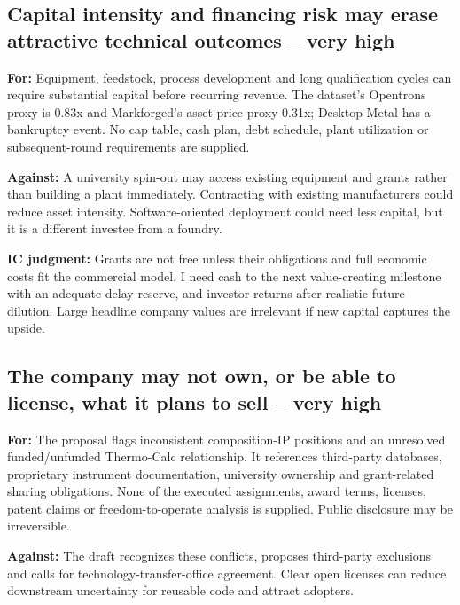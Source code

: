 \documentclass{article}
\begin{document}
\subsection{Capital intensity and financing risk may erase attractive
technical outcomes -- very
high}\label{capital-intensity-and-financing-risk-may-erase-attractive-technical-outcomes-very-high}

\textbf{For:} Equipment, feedstock, process development and long
qualification cycles can require substantial capital before recurring
revenue. The dataset's Opentrons proxy is 0.83x and Markforged's
asset-price proxy 0.31x; Desktop Metal has a bankruptcy event. No cap
table, cash plan, debt schedule, plant utilization or subsequent-round
requirements are supplied. \citep{InputData}

\textbf{Against:} A university spin-out may access existing equipment
and grants rather than building a plant immediately. Contracting with
existing manufacturers could reduce asset intensity. Software-oriented
deployment could need less capital, but it is a different investee from
a foundry.

\textbf{IC judgment:} Grants are not free unless their obligations and
full economic costs fit the commercial model. I need cash to the next
value-creating milestone with an adequate delay reserve, and investor
returns after realistic future dilution. Large headline company values
are irrelevant if new capital captures the upside.

\subsection{The company may not own, or be able to license, what it
plans to sell -- very
high}\label{the-company-may-not-own-or-be-able-to-license-what-it-plans-to-sell-very-high}

\textbf{For:} The proposal flags inconsistent composition-IP positions
and an unresolved funded/unfunded Thermo-Calc relationship. It
references third-party databases, proprietary instrument documentation,
university ownership and grant-related sharing obligations. None of the
executed assignments, award terms, licenses, patent claims or
freedom-to-operate analysis is supplied. Public disclosure may be
irreversible. \citep{InputRecommendations,InputProposal}

\textbf{Against:} The draft recognizes these conflicts, proposes
third-party exclusions and calls for technology-transfer-office
agreement. Clear open licenses can reduce downstream uncertainty for
reusable code and attract adopters.
\end{document}
